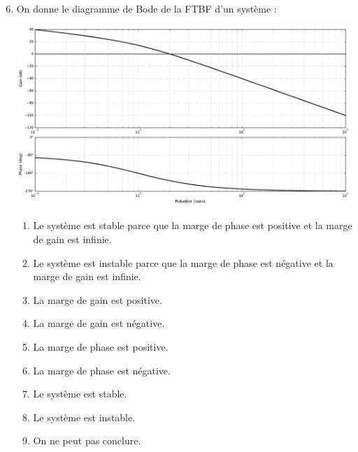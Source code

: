 \documentclass[10pt,fleqn]{article} %
\begin{document}
\begin{multicols}{2}
\begin{enumerate}
\setcounter{enumi}{5}
\item On donne le diagramme de Bode de la FTBF d'un système : 
\begin{center}
\includegraphics[width=\linewidth]{images/img_03}
\end{center}
\begin{enumerate}
\item Le système est stable parce que la marge de phase est positive et la marge de gain est infinie.
\item Le système est instable parce que la marge de phase est négative et la marge de gain est infinie.
\item La marge de gain est positive.
\item La marge de gain est négative.
\item La marge de phase est positive.
\item La marge de phase est négative.
\item Le système est stable.
\item Le système est instable.
\item On ne peut pas conclure. %
\end{enumerate}
\end{enumerate}


\end{multicols}
\end{document}
